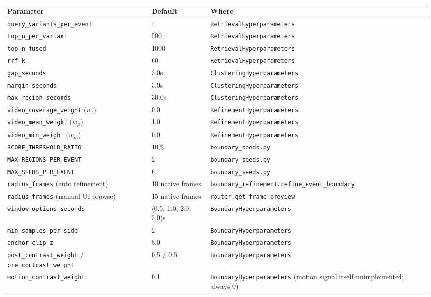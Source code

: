 \documentclass[11pt]{article}
\newcommand{\code}[1]{\texttt{\small #1}}
\begin{document}
\begin{longtable}{@{}p{}p{}p{}@{}}
\toprule
\textbf{Parameter} & \textbf{Default} & \textbf{Where} \\
\midrule
\endhead
\code{query\_variants\_per\_event} & 4 & \code{RetrievalHyperparameters} \\
\code{top\_n\_per\_variant} & 500 & \code{RetrievalHyperparameters} \\
\code{top\_n\_fused} & 1000 & \code{RetrievalHyperparameters} \\
\code{rrf\_k} & 60 & \code{RetrievalHyperparameters} \\
\code{gap\_seconds} & 3.0s & \code{ClusteringHyperparameters} \\
\code{margin\_seconds} & 3.0s & \code{ClusteringHyperparameters} \\
\code{max\_region\_seconds} & 30.0s & \code{ClusteringHyperparameters} \\
\code{video\_coverage\_weight} ($w_c$) & 0.0 & \code{RefinementHyperparameters} \\
\code{video\_mean\_weight} ($w_\mu$) & 1.0 & \code{RefinementHyperparameters} \\
\code{video\_min\_weight} ($w_m$) & 0.0 & \code{RefinementHyperparameters} \\
\code{SCORE\_THRESHOLD\_RATIO} & 10\% & \code{boundary\_seeds.py} \\
\code{MAX\_REGIONS\_PER\_EVENT} & 2 & \code{boundary\_seeds.py} \\
\code{MAX\_SEEDS\_PER\_EVENT} & 6 & \code{boundary\_seeds.py} \\
\code{radius\_frames} (auto refinement) & 10 native frames & \code{boundary\_refinement.refine\_event\_boundary} \\
\code{radius\_frames} (manual UI browse) & 15 native frames & \code{router.get\_frame\_preview} \\
\code{window\_options\_seconds} & (0.5, 1.0, 2.0, 3.0)s & \code{BoundaryHyperparameters} \\
\code{min\_samples\_per\_side} & 2 & \code{BoundaryHyperparameters} \\
\code{anchor\_clip\_z} & 8.0 & \code{BoundaryHyperparameters} \\
\code{post\_contrast\_weight} / \code{pre\_contrast\_weight} & 0.5 / 0.5 & \code{BoundaryHyperparameters} \\
\code{motion\_contrast\_weight} & 0.1 & \code{BoundaryHyperparameters} (motion signal itself unimplemented; always 0) \\

\end{longtable}
\end{document}
